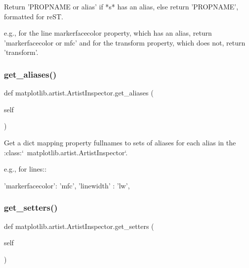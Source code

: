 \begin{DoxyVerb}Return 'PROPNAME or alias' if *s* has an alias, else return 'PROPNAME',
formatted for reST.

e.g., for the line markerfacecolor property, which has an
alias, return 'markerfacecolor or mfc' and for the transform
property, which does not, return 'transform'.
\end{DoxyVerb}
 \mbox{\label{classmatplotlib_1_1artist_1_1ArtistInspector_a04d9c28b08088f8839e14a4b6d3e57aa}} 
\subsubsection{\texorpdfstring{get\+\_\+aliases()}{get\_aliases()}}
{\footnotesize\ttfamily def matplotlib.\+artist.\+Artist\+Inspector.\+get\+\_\+aliases (\begin{DoxyParamCaption}\item[{}]{self }\end{DoxyParamCaption})}

\begin{DoxyVerb}Get a dict mapping property fullnames to sets of aliases for each alias
in the :class:`~matplotlib.artist.ArtistInspector`.

e.g., for lines::

  {'markerfacecolor': {'mfc'},
   'linewidth'      : {'lw'},
  }
\end{DoxyVerb}
 \mbox{\label{classmatplotlib_1_1artist_1_1ArtistInspector_a7cd62163bffa3947835a355bb2d7be66}} 
\subsubsection{\texorpdfstring{get\+\_\+setters()}{get\_setters()}}
{\footnotesize\ttfamily def matplotlib.\+artist.\+Artist\+Inspector.\+get\+\_\+setters (\begin{DoxyParamCaption}\item[{}]{self }\end{DoxyParamCaption})}


